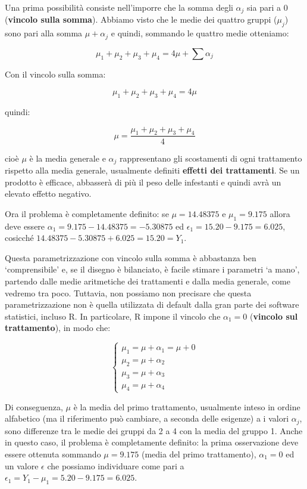 \documentclass[a4paper,12pt,oneside]{book}
\begin{document}
Una prima possibilità consiste nell'imporre che la somma degli \(\alpha_j\) sia pari a 0 (\textbf{vincolo sulla somma}). Abbiamo visto che le medie dei quattro gruppi (\(\mu_j\)) sono pari alla somma \(\mu + \alpha_j\) e quindi, sommando le quattro medie otteniamo:

\[ \mu_1 + \mu_2 + \mu_3 + \mu_4 = 4 \mu + \sum{\alpha_j}\]

Con il vincolo sulla somma:

\[ \mu_1 + \mu_2 + \mu_3 + \mu_4 = 4 \mu\]

quindi:

\[\mu = \frac{\mu_1 + \mu_2 + \mu_3 + \mu_4}{4} \]

cioè \(\mu\) è la media generale e \(\alpha_j\) rappresentano gli scostamenti di ogni trattamento rispetto alla media generale, usualmente definiti \textbf{effetti dei trattamenti}. Se un prodotto è efficace, abbasserà di più il peso delle infestanti e quindi avrà un elevato effetto negativo.

Ora il problema è completamente definito: se \(\mu = 14.48375\) e \(\mu_1 = 9.175\) allora deve essere \(\alpha_1 = 9.175 - 14.48375 = -5.30875\) ed \(\epsilon_1 = 15.20 - 9.175 = 6.025\), cosicché \(14.48375 - 5.30875 + 6.025 = 15.20 = Y_1\).

Questa parametrizzazione con vincolo sulla somma è abbastanza ben `comprensibile' e, se il disegno è bilanciato, è facile stimare i parametri `a mano', partendo dalle medie aritmetiche dei trattamenti e dalla media generale, come vedremo tra poco. Tuttavia, non possiamo non precisare che questa parametrizzazione non è quella utilizzata di default dalla gran parte dei software statistici, incluso R. In particolare, R impone il vincolo che \(\alpha_1 = 0\) (\textbf{vincolo sul trattamento}), in modo che:

\[ \left\{ {\begin{array}{l}
\mu_1 = \mu + \alpha_1 = \mu + 0\\
\mu_2 = \mu + \alpha_2 \\
\mu_3 = \mu + \alpha_3 \\
\mu_4 = \mu + \alpha_4
\end{array}} \right.\]

Di conseguenza, \(\mu\) è la media del primo trattamento, usualmente inteso in ordine alfabetico (ma il riferimento può cambiare, a seconda delle esigenze) a i valori \(\alpha_j\), sono differenze tra le medie dei gruppi da 2 a 4 con la media del gruppo 1. Anche in questo caso, il problema è completamente definito: la prima osservazione deve essere ottenuta sommando \(\mu = 9.175\) (media del primo trattamento), \(\alpha_1 = 0\) ed un valore \(\epsilon\) che possiamo individuare come pari a \(\epsilon_1 = Y_1 - \mu_1 = 5.20 - 9.175 = 6.025\).
\end{document}
